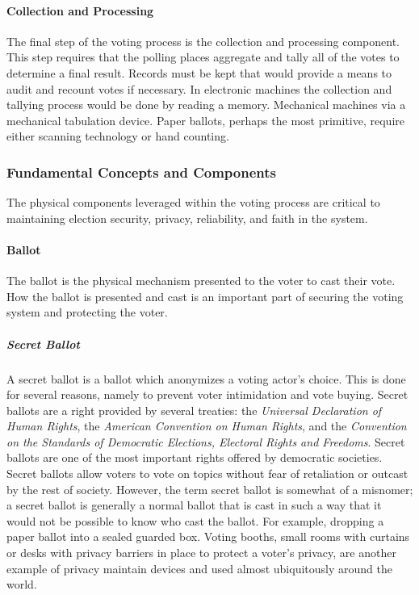 \paragraph{Collection and Processing}
The final step of the voting process is the collection and processing component.
This step requires that the polling places aggregate and tally all of the votes
to determine a final result. Records must be kept that would provide a means to
audit and recount votes if necessary. In electronic machines the collection and
tallying process would be done by reading a memory. Mechanical machines via a
mechanical tabulation device. Paper ballots, perhaps the most primitive, require
either scanning technology or hand counting.


\subsubsection{Fundamental Concepts and Components}
The physical components leveraged within the voting process are critical to
maintaining election security, privacy, reliability, and faith in the system.

\paragraph{Ballot}
The ballot is the physical mechanism presented to the voter to cast their vote.
How the ballot is presented and cast is an important part of securing the voting
system and protecting the voter.

\subparagraph{Secret Ballot}
A secret ballot is a ballot which anonymizes a voting actor's choice. This is
done for several reasons, namely to prevent voter intimidation and vote buying.
Secret ballots are a right provided by several treaties: the \emph{Universal
Declaration of Human Rights}, the \emph{American Convention on Human Rights},
and the \emph{Convention on the Standards of Democratic Elections, Electoral
Rights and Freedoms}. Secret ballots are one of the most important rights
offered by democratic societies. Secret ballots allow voters to vote on topics
without fear of retaliation or outcast by the rest of society. However, the term
secret ballot is somewhat of a misnomer; a secret ballot is generally a normal
ballot that is cast in such a way that it would not be possible to know who cast
the ballot. For example, dropping a paper ballot into a sealed guarded box.
Voting booths, small rooms with curtains or desks with privacy barriers in place
to protect a voter's privacy, are another example of privacy maintain devices
and used almost ubiquitously around the world.


